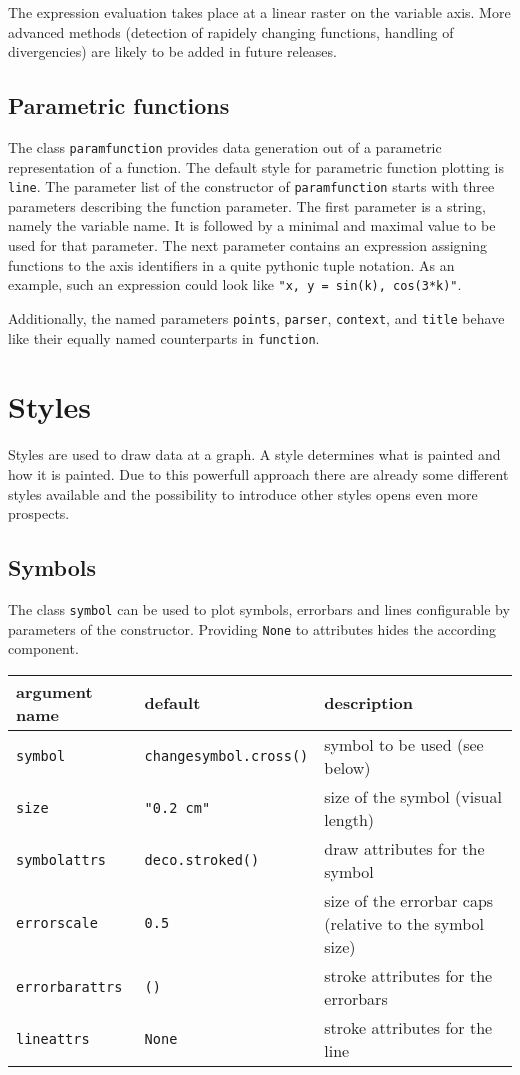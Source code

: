The expression evaluation takes place at a linear raster on the
variable axis. More advanced methods (detection of rapidely changing
functions, handling of divergencies) are likely to be added in future
releases.

\subsection{Parametric functions}

The class \verb|paramfunction| provides data generation out of a
parametric representation of a function. The default style for
parametric function plotting is \verb|line|. The parameter list of the
constructor of \verb|paramfunction| starts with three parameters
describing the function parameter. The first parameter is a string,
namely the variable name. It is followed by a minimal and maximal
value to be used for that parameter. The next parameter contains an
expression assigning functions to the axis identifiers in a quite
pythonic tuple notation. As an example, such an expression could look
like \verb|"x, y = sin(k), cos(3*k)"|.

Additionally, the named parameters \verb|points|, \verb|parser|,
\verb|context|, and \verb|title| behave like their equally named
counterparts in \verb|function|.

\section{Styles}
\label{graph:styles}

Styles are used to draw data at a graph. A style determines what is
painted and how it is painted. Due to this powerfull approach there
are already some different styles available and the possibility to
introduce other styles opens even more prospects.

\subsection{Symbols}

The class \verb|symbol| can be used to plot symbols, errorbars and lines
configurable by parameters of the constructor. Providing \verb|None|
to attributes hides the according component.

\medskip
\begin{tabularx}{\linewidth}{ll>{\raggedright\arraybackslash}X}
argument name&default&description\\
\hline
\texttt{symbol}&\texttt{changesymbol.cross()}&symbol to be used (see below)\\
\texttt{size}&\texttt{"0.2 cm"}&size of the symbol (visual length)\\
\texttt{symbolattrs}&\texttt{deco.stroked()}&draw attributes for the symbol\\
\texttt{errorscale}&\texttt{0.5}&size of the errorbar caps (relative to the symbol size)\\
\texttt{errorbarattrs}&\texttt{()}&stroke attributes for the errorbars\\
\texttt{lineattrs}&\texttt{None}&stroke attributes for the line\\
\end{tabularx}
\medskip

